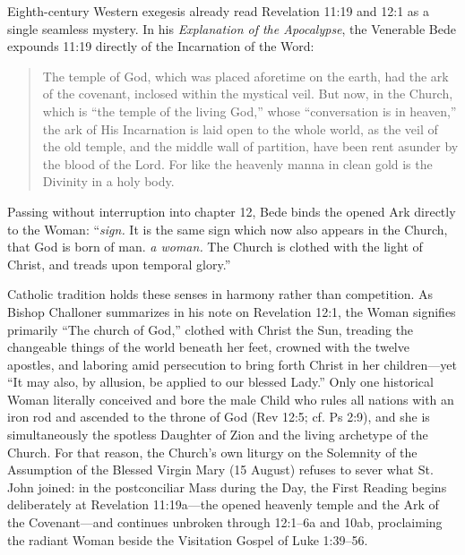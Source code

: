 Eighth-century Western exegesis already read Revelation 11:19 and 12:1 as a single seamless mystery. In his \textit{Explanation of the Apocalypse}, the Venerable Bede expounds 11:19 directly of the Incarnation of the Word:

\begin{quote}\small
The temple of God, which was placed aforetime on the earth, had the ark of the covenant, inclosed within the mystical veil. But now, in the Church, which is ``the temple of the living God,'' whose ``conversation is in heaven,'' the ark of His Incarnation is laid open to the whole world, as the veil of the old temple, and the middle wall of partition, have been rent asunder by the blood of the Lord. For like the heavenly manna in clean gold is the Divinity in a holy body.
\end{quote}

Passing without interruption into chapter 12, Bede binds the opened Ark directly to the Woman: ``\textit{sign.} It is the same sign which now also appears in the Church, that God is born of man. \textit{a woman.} The Church is clothed with the light of Christ, and treads upon temporal glory.''

Catholic tradition holds these senses in harmony rather than competition. As Bishop Challoner summarizes in his note on Revelation 12:1, the Woman signifies primarily ``The church of God,'' clothed with Christ the Sun, treading the changeable things of the world beneath her feet, crowned with the twelve apostles, and laboring amid persecution to bring forth Christ in her children---yet ``It may also, by allusion, be applied to our blessed Lady.'' Only one historical Woman literally conceived and bore the male Child who rules all nations with an iron rod and ascended to the throne of God (Rev 12:5; cf. Ps 2:9), and she is simultaneously the spotless Daughter of Zion and the living archetype of the Church. For that reason, the Church's own liturgy on the Solemnity of the Assumption of the Blessed Virgin Mary (15 August) refuses to sever what St. John joined: in the postconciliar Mass during the Day, the First Reading begins deliberately at Revelation 11:19a---the opened heavenly temple and the Ark of the Covenant---and continues unbroken through 12:1--6a and 10ab, proclaiming the radiant Woman beside the Visitation Gospel of Luke 1:39--56.

